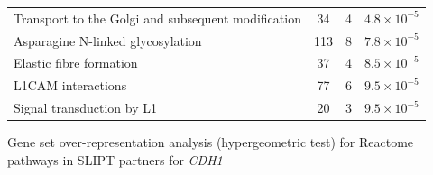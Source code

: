 \begin{table}[!ht]
{\begin{threeparttable}
\begin{tabular}{lccc}
  Transport to the Golgi and subsequent modification &  34 &   4 & $4.8 \times 10^{-5}$ \\ 
  \rowcolor{black!10}
  Asparagine N-linked glycosylation & 113 &   8 & $7.8 \times 10^{-5}$ \\ 
  \rowcolor{black!5}
  Elastic fibre formation &  37 &   4 & $8.5 \times 10^{-5}$ \\ 
  \rowcolor{black!10}
  L1CAM interactions &  77 &   6 & $9.5 \times 10^{-5}$ \\ 
  \rowcolor{black!5}
  Signal transduction by L1 &  20 &   3 & $9.5 \times 10^{-5}$ \\ 
  \hline
\end{tabular}
\begin{tablenotes}
\raggedright \small
Gene set over-representation analysis (hypergeometric test) for Reactome pathways in SLIPT partners for \textit{CDH1}
\end{tablenotes}
\end{threeparttable}
}
\end{table}

\FloatBarrier
